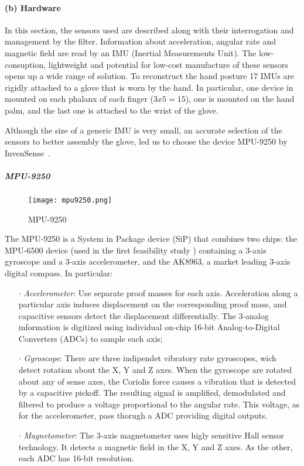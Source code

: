 \paragraph{(b) Hardware}

In this section, the sensors used are described along with their interrogation and management by the filter. Information about acceleration, angular rate and  magnetic field are read by an IMU (Inertial Measurements Unit).  The low-consuption, lightweight and potential for low-cost manufacture of these sensors opens up a wide range of solution. To reconstruct the hand posture 17 IMUs are rigidly attached to a glove that is worn by the hand. In particular, one device in mounted on each phalanx of each finger ($3x5=15$), one is mounted on the hand palm, and the last one is attached to the wrist of the glove.

Although the size of a generic IMU is very small, an accurate selection of the sensors to better assembly the glove, led us to choose the device MPU-9250 by InvenSense~\cite{MPU9250}.  \\

\subparagraph{MPU-9250}

\begin{figure}[h]
\centering
\texttt{[image: mpu9250.png]}
\caption{MPU-9250}
\label{fig:mpu9250}
\end{figure}

The MPU-9250 is a System in Package device (SiP) that combines two chips: the MPU-6500 device (used in the first feasibility study \cite{Santaera:ICRA:2015}) containing a 3-axis gyroscope and a 3-axis accelerometer, and the AK8963, a market leading 3-axis digital compass. In particular:

\begin{itemize}
\item[$\cdot$] \textit{Accelerometer}: Use separate proof masses for each axis. Acceleration along a particular axis induces displacement on the corresponding proof mass, and capacitive sensors detect the displacement differentially. The 3-analog information is digitized using individual on-chip 16-bit Analog-to-Digital Converters (ADCs) to sample each axis;

 \item[$\cdot$] \textit{Gyroscope}: There are three indipendet vibratory rate gyroscopes, wich detect rotation about the X, Y and Z axes. When the gyroscope are rotated about any of sense axes, the Coriolis force causes a vibration that is detected by a capacitive pickoff. The resulting signal is amplified, demodulated and filtered to produce a voltage proportional to the angular rate. This voltage, as for the accelerometer, pass thorugh a ADC providing digital outputs.

 \item[$\cdot$] \textit{Magnetometer}: The 3-axis magnetometer uses higly sensitive Hall sensor technology. It detects a magnetic field in the X, Y and Z axes. As the other, each ADC has 16-bit resolution.
\end{itemize}

